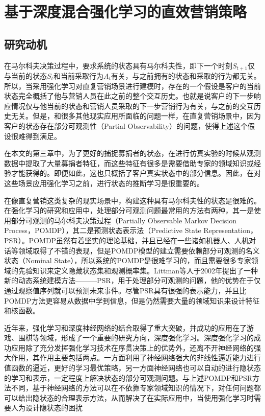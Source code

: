 
\chapter{基于深度混合强化学习的直效营销策略}

\section{研究动机}
在马尔科夫决策过程中，要求系统的状态具有马尔科夫性，即下一个时刻$S_{t+1}$仅与当前的状态$S_{t}$和当前采取行为$A_{t}$有关，与之前拥有的状态和采取的行为都无关。所以，当采用强化学习对直复营销场景进行建模时，存在的一个假设是客户的当前状态完全概括了他与营销人员在此之前的整个交互历史。也就是说客户的下一步响应情况仅与他当前的状态和营销人员采取的下一步营销行为有关，与之前的交互历史无关。但是，和很多其他现实应用所面临的问题一样，在直复营销场景中，因为客户的状态存在部分可观测性（Partial Observability）的问题，使得上述这个假设很难得到满足。

在本文的第三章中，为了更好的捕捉募捐者的状态，在进行仿真实验的时候从观测数据中提取了大量募捐者特征，而这些特征有很多是需要借助专家的领域知识或经验才能获得的。即便如此，这也只概括了客户真实状态中的部分信息。因此，在对这些场景应用强化学习之前，进行状态的推断学习是很重要的。

在像直复营销这类复杂的现实场景中，构建这种具有马尔科夫性的状态是很难的。在强化学习的研究和应用中，处理部分可观测问题最常用的方法有两种，其一是使用部分可观测的马尔科夫决策过程（Partially Observable Markov  Decision Process，POMDP）\citep{kaelbling1998planning}，其二是预测状态表示法（Predictive State Representation，PSR）\citep{littman2002predictive}。POMDP虽然有着坚实的理论基础，并且已经在一些诸如机器人、人机对话等领域取得了不错的表现\citep{pineau2003point,williams2007partially}，但是POMDP模型的建立需要依赖部分可观测的名义状态（Nominal State），所以系统的POMDP是很难学习的，而且需要很多专家领域的先验知识来定义隐藏状态集和观测概率集。Littman等人于2002年提出了一种新的动态系统建模方法———PSR\citep{littman2002predictive}，用于处理部分可观测的问题，他的优势在于仅通过观察值序列就可以预测未来事件。尽管PSR具有很强的表示能力，并且比POMDP方法更容易从数据中学到信息，但是仍然需要大量的领域知识来设计特征和核函数。

近年来，强化学习和深度神经网络的结合取得了重大突破，并成功的应用在了游戏、围棋等领域\citep{mnih2013playing, mnih2015human}，形成了一个重要的研究方向，深度强化学习。深度强化学习的成功应用除了充分发挥强化学习技术在序贯决策上的优势外，还离不开神经网络的强大作用，其作用主要包括两点。一方面利用了神经网络强大的非线性逼近能力进行值函数的逼近，更好的学习最优策略，另一方面神经网络也可以自动的进行隐状态的学习和表示，一定程度上解决状态的部分可观测问题。与上述POMDP和PSR方法不同，基于神经网络的方法可以在不依靠专家领域知识的情况下，对任何问题都可以给出隐状态的合理表示方法\citep{deng2014deep}，从而解决了在实际应用中，当使用强化学习时需要人为设计隐状态的困扰

